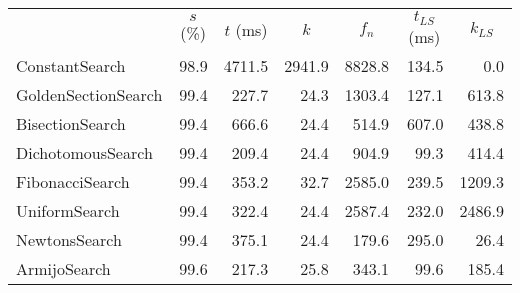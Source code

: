 \documentclass[a4paper,english,titlepage,12pt]{article}
\begin{document}
\begin{center}
\label{tab:performance_results_MatrixSquareSum}
\begin{tabular}{|l|r|r|r|r|r|r|}
\hline
\rowcolor{gray!25}
\multicolumn{1}{|c|}{Line Search Name} & \multicolumn{1}{c|}{$s$ (\%)} & \multicolumn{1}{c|}{$t$ (ms)} & \multicolumn{1}{c|}{$k$} & \multicolumn{1}{c|}{$f_n$} & \multicolumn{1}{c|}{$t_{LS}$ (ms)} & \multicolumn{1}{c|}{$k_{LS}$} \\
ConstantSearch & 98.9 & 4711.5 & 2941.9 & 8828.8 & 134.5 & 0.0 \\
GoldenSectionSearch & 99.4 & 227.7 & 24.3 & 1303.4 & 127.1 & 613.8 \\
BisectionSearch & 99.4 & 666.6 & 24.4 & 514.9 & 607.0 & 438.8 \\
DichotomousSearch & 99.4 & 209.4 & 24.4 & 904.9 & 99.3 & 414.4 \\
FibonacciSearch & 99.4 & 353.2 & 32.7 & 2585.0 & 239.5 & 1209.3 \\
UniformSearch & 99.4 & 322.4 & 24.4 & 2587.4 & 232.0 & 2486.9 \\
NewtonsSearch & 99.4 & 375.1 & 24.4 & 179.6 & 295.0 & 26.4 \\
ArmijoSearch & 99.6 & 217.3 & 25.8 & 343.1 & 99.6 & 185.4 \\

\hline
\end{tabular}
\end{center}
\end{document}
